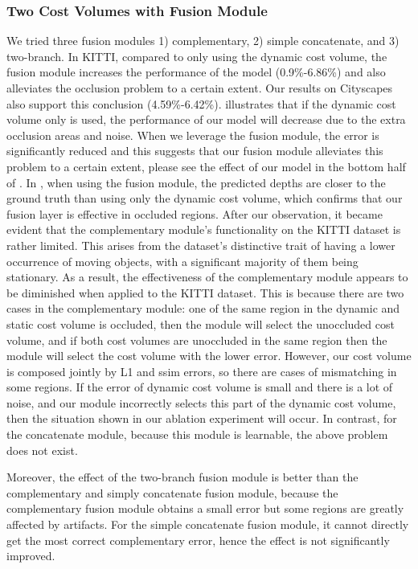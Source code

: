 \documentclass[journal]{IEEEtran}
\begin{document}
\subsubsection{Two Cost Volumes with Fusion Module} We tried three fusion modules 1) complementary, 2) simple concatenate, and 3) two-branch. In KITTI, compared to only using the dynamic cost volume, the fusion module increases the performance of the model (0.9\%-6.86\%) and also alleviates the occlusion problem to a certain extent. Our results on Cityscapes also support this conclusion (4.59\%-6.42\%).  illustrates that if the dynamic cost volume only is used, the performance of our model will decrease due to the extra occlusion areas and noise. When we leverage the fusion module, the error is significantly reduced and this suggests that our fusion module alleviates this problem to a certain extent, please see the effect of our model in the bottom half of . In , when using the fusion module, the predicted depths are closer to the ground truth than using only the dynamic cost volume, which confirms that our fusion layer is effective in occluded regions. After our observation, it became evident that the complementary module's functionality on the KITTI dataset is rather limited. This arises from the dataset's distinctive trait of having a lower occurrence of moving objects, with a significant majority of them being stationary. As a result, the effectiveness of the complementary module appears to be diminished when applied to the KITTI dataset. This is because there are two cases in the complementary module: one of the same region in the dynamic and static cost volume is occluded, then the module will select the unoccluded cost volume, and if both cost volumes are unoccluded in the same region then the module will select the cost volume with the lower error. However, our cost volume is composed jointly by L1 and ssim errors, so there are cases of mismatching in some regions. If the error of dynamic cost volume is small and there is a lot of noise, and our module incorrectly selects this part of the dynamic cost volume, then the situation shown in our ablation experiment will occur. In contrast, for the concatenate module, because this module is learnable, the above problem does not exist.

Moreover, the effect of the two-branch fusion module is better than the complementary and simply concatenate fusion module, because the complementary fusion module obtains a small error but some regions are greatly affected by artifacts. For the simple concatenate fusion module, it cannot directly get the most correct complementary error, hence the effect is not significantly improved.
\end{document}
